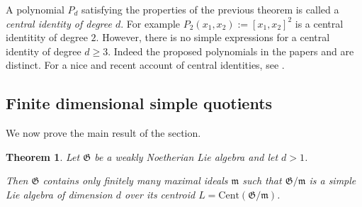 \documentclass[11pt, letterpaper, reqno]{amsart}
\newtheorem{theorem}{Theorem}
\theoremstyle{definition}
\newcommand{\fm}{\mathfrak{m}}
\newcommand{\fG}{\mathfrak{G}}
\newcommand{\Cent}{\mathrm{Cent}}
\begin{document}
A polynomial $P_d$ satisfying the properties of the previous theorem is 
called a {\it central identity of degree $d$}.
For example $P_2(x_1,x_2):=[x_1,x_2]^2$ is a central identitity of degree $2$.
However,  there is no simple expressions
for a central identity of degree $d\geq 3$.  Indeed the proposed polynomials in the papers 
\cite{Formanek} and \cite{Razmyslov} are distinct.
For a  nice and recent account of central identities,
see \cite{BMRV}.
 



\subsection{Finite dimensional simple quotients}

We now prove the main result of the section.


\begin{theorem}\label{structure1} Let $\fG$ be a  weakly Noetherian Lie algebra and let $d> 1$.

Then $\fG$ contains only finitely many maximal ideals $\fm$ such that $\fG/\fm$ is a simple Lie algebra of dimension $d$ over its centroid $L=\Cent(\fG/\fm)$.
\end{theorem}
\end{document}
